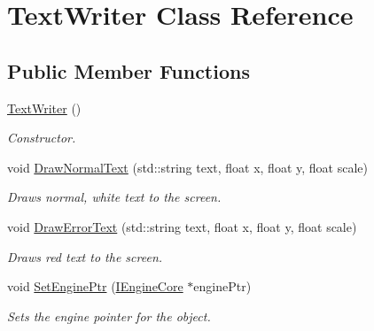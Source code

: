 \hypertarget{class_text_writer}{}\section{Text\+Writer Class Reference}
\label{class_text_writer}
\subsection*{Public Member Functions}
\begin{DoxyCompactItemize}
\item 
\mbox{\label{class_text_writer_ad77b980fabda2f931692263a56324446}} 
\mbox{\hyperlink{class_text_writer_ad77b980fabda2f931692263a56324446}{Text\+Writer}} ()
\begin{DoxyCompactList}\small\item\em Constructor. \end{DoxyCompactList}\item 
\mbox{\label{class_text_writer_af26acc26d285763642169e19284392fb}} 
void \mbox{\hyperlink{class_text_writer_af26acc26d285763642169e19284392fb}{Draw\+Normal\+Text}} (std\+::string text, float x, float y, float scale)
\begin{DoxyCompactList}\small\item\em Draws normal, white text to the screen. \end{DoxyCompactList}\item 
\mbox{\label{class_text_writer_a180fabccd3230c8765d0612e8097e9c5}} 
void \mbox{\hyperlink{class_text_writer_a180fabccd3230c8765d0612e8097e9c5}{Draw\+Error\+Text}} (std\+::string text, float x, float y, float scale)
\begin{DoxyCompactList}\small\item\em Draws red text to the screen. \end{DoxyCompactList}\item 
\mbox{\label{class_text_writer_af0fc86c34a2eaab031625c6d4ba5cf03}} 
void \mbox{\hyperlink{class_text_writer_af0fc86c34a2eaab031625c6d4ba5cf03}{Set\+Engine\+Ptr}} (\mbox{\hyperlink{class_i_engine_core}{I\+Engine\+Core}} $\ast$engine\+Ptr)
\begin{DoxyCompactList}\small\item\em Sets the engine pointer for the object. \end{DoxyCompactList}\end{DoxyCompactItemize}
